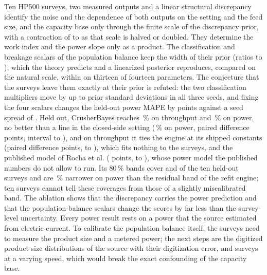 \documentclass[journal]{IEEEtran}
\newcommand{\pct}{\,\%}
\begin{document}
Ten HP500 surveys, two measured outputs and a linear structural discrepancy identify the noise and the dependence of both
outputs on the setting and the feed size, and the capacity base only through the finite scale of the discrepancy prior,
with a contraction of \abTauHalfQRefContr{} to \abTauDoubleQRefContr{} as that scale is halved or doubled. They determine the work index and the power slope only as a
product. The classification and breakage scalars of the population balance keep the width of their prior (ratios
\kOneScaleContr{} to \kTwoScaleContr), which the theory predicts and a linearized posterior reproduces, compared on the
natural scale, within \thLapMaxDevRest{} on thirteen of fourteen parameters. The conjecture that the surveys leave them
exactly at their prior is refuted: the two classification multipliers move by up to \shiftKOneMax{} prior standard
deviations in all three seeds, and fixing the four scalars changes the held-out power MAPE by \balFixGainKw{} points
against a seed spread of \seedSpreadKw. Held out, CrusherBayes reaches \cbTphMape\pct{} on throughput and \cbKwMape\pct{}
on power, no better than a line in the closed-side setting (\BlinKwMape\pct{} on power, paired difference \dBlinKw{} points,
interval \dBlinKwLo{} to \dBlinKwHi), and on throughput it ties the engine at its shipped constants (paired difference
\dPubTph{} points, \dPubTphLo{} to \dPubTphHi), which fits nothing to the surveys, and the published model of Rocha et al.
(\dRochaPubTph{} points, \dRochaPubTphLo{} to \dRochaPubTphHi), whose power model the published numbers do not allow to run. Its 80\pct{} bands cover \cbTphCovN{} and \cbKwCovN{} of the ten held-out surveys and
are \widthRedKw\pct{} narrower on power than the residual band of the refit engine; ten surveys cannot tell these
coverages from those of a slightly miscalibrated band. The ablation shows that the discrepancy carries the power
prediction and that the population-balance scalars change the scores by far less than the survey-level uncertainty. Every
power result rests on a power that the source estimated from electric current. To calibrate the population balance
itself, the surveys need to measure the product size and a metered power; the next steps are the
digitized product size distributions of the source with their digitization error, and surveys at a varying speed, which
would break the exact confounding of the capacity base.
\end{document}
